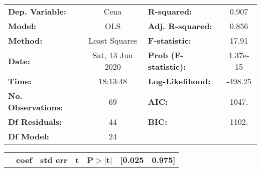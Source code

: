 \documentclass[11pt,a4paper]{article}
\begin{document}
		\begin{center}
			\begin{tabular}{lclc}
				 
				\textbf{Dep. Variable:}           &       Cena       & \textbf{  R-squared:         } &     0.907   \\
				\textbf{Model:}                   &       OLS        & \textbf{  Adj. R-squared:    } &     0.856   \\
				\textbf{Method:}                  &  Least Squares   & \textbf{  F-statistic:       } &     17.91   \\
				\textbf{Date:}                    & Sat, 13 Jun 2020 & \textbf{  Prob (F-statistic):} &  1.37e-15   \\
				\textbf{Time:}                    &     18:13:48     & \textbf{  Log-Likelihood:    } &   -498.25   \\
				\textbf{No. Observations:}        &          69      & \textbf{  AIC:               } &     1047.   \\
				\textbf{Df Residuals:}            &          44      & \textbf{  BIC:               } &     1102.   \\
				\textbf{Df Model:}                &          24      & \textbf{                     } &             \\
				 
			\end{tabular}
			\begin{tabular}{lcccccc}
				& \textbf{coef} & \textbf{std err} & \textbf{t} & \textbf{P$> |$t$|$} & \textbf{[0.025} & \textbf{0.975]}  \\
				 

\end{tabular}
\end{center}
\end{document}
